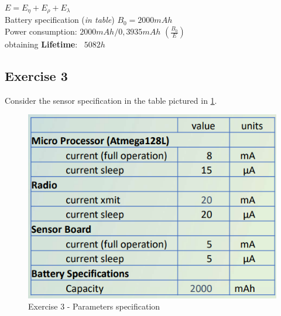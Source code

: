 \begin{center}
	$E = E_{\eta} + E_{\rho} + E_{\lambda}$\\
	Battery specification (\textit{in table}) $B_{0} = 2000mAh$\\
	Power consumption: $2000 mAh / 0,3935 mAh$    $(\frac{B_{0}}{E})$ \\
	obtaining \textbf{Lifetime}:  $5082 h$   
\end{center}




\subsection{Exercise 3}
Consider the sensor specification in the table pictured in \ref{chenergy-ex3}.
\begin{figure}
	\centering\includegraphics[scale=0.50]{images/Pasted image 20230328162514.png}
	\caption{Exercise 3 - Parameters specification}
	\label{chenergy-ex3}
\end{figure}

